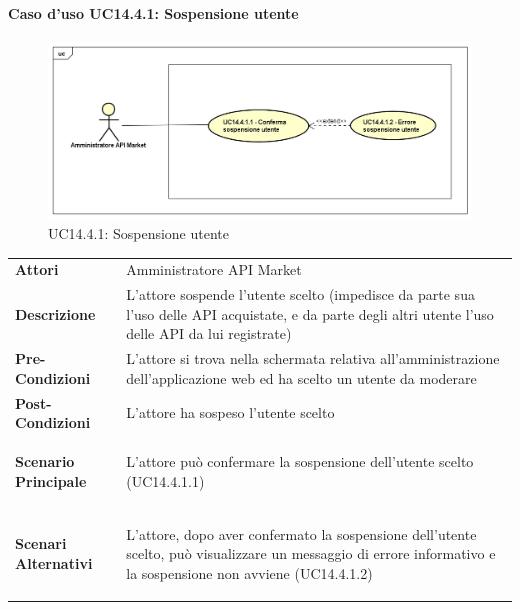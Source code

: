 \newpage
\paragraph{Caso d'uso UC14.4.1: Sospensione utente}
\label{UC14_4_1}
\begin{figure}[ht]
	\centering
	\includegraphics[scale=0.45]{UML/UC14_4_1.png}
	\caption{UC14.4.1: Sospensione utente}
\end{figure}

\begin{minipage}{\linewidth}
	\begin{tabular}{ l | p{11cm}}
		\hline
		\rowcolor{Gray}
		\multicolumn{2}{c}{UC14.4.1 - Sospensione utente} \\
		\hline
		\textbf{Attori} & Amministratore API Market \\
		\textbf{Descrizione} & L'attore sospende l'utente scelto (impedisce da parte sua l'uso delle API acquistate, e da parte degli altri utente l'uso delle API da lui registrate) \\
		\textbf{Pre-Condizioni} & L'attore si trova nella schermata relativa all'amministrazione dell'applicazione web ed ha scelto un utente da moderare \\
		\textbf{Post-Condizioni} & L'attore ha sospeso l'utente scelto \\
		\textbf{Scenario Principale} & 
		\begin{enumerate*}[label=(\arabic*.),itemjoin={\newline}]
			\item L'attore può confermare la sospensione dell'utente scelto (UC14.4.1.1)
		\end{enumerate*}\\
		\textbf{Scenari Alternativi} & 
		\begin{enumerate*}[label=(\arabic*.),itemjoin={\newline}]
			\item L'attore, dopo aver confermato la sospensione dell'utente scelto, può visualizzare un messaggio di errore informativo e la sospensione non avviene (UC14.4.1.2)
		\end{enumerate*}\\
	\end{tabular}
\end{minipage}

